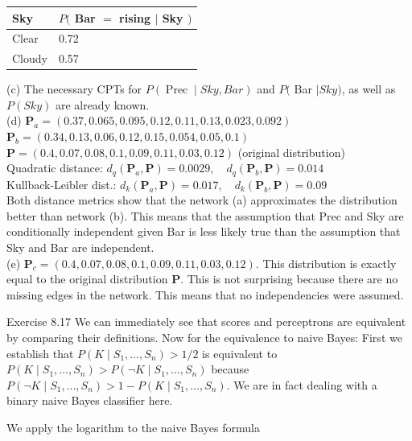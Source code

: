 \documentclass[10pt]{article}
\begin{document}
\begin{center}
\begin{tabular}{ll}
\hline
Sky & $P($ Bar $=$ rising $\mid$ Sky $)$ \\
\hline
Clear & 0.72 \\
\hline
Cloudy & 0.57 \\
\hline
\end{tabular}
\end{center}

(c) The necessary CPTs for $P(\operatorname{Prec} \mid S k y, B a r)$ and $P($ Bar $\mid S k y)$, as well as $P(S k y)$ are already known.\\
(d) $\boldsymbol{P}_{a}=(0.37,0.065,0.095,0.12,0.11,0.13,0.023,0.092)$\\
$\boldsymbol{P}_{b}=(0.34,0.13,0.06,0.12,0.15,0.054,0.05,0.1)$\\
$\boldsymbol{P}=(0.4,0.07,0.08,0.1,0.09,0.11,0.03,0.12)$ (original distribution)\\
Quadratic distance: $d_{q}\left(\boldsymbol{P}_{a}, \boldsymbol{P}\right)=0.0029, \quad d_{q}\left(\boldsymbol{P}_{b}, \boldsymbol{P}\right)=0.014$\\
Kullback-Leibler dist.: $d_{k}\left(\boldsymbol{P}_{a}, \boldsymbol{P}\right)=0.017, \quad d_{k}\left(\boldsymbol{P}_{b}, \boldsymbol{P}\right)=0.09$\\
Both distance metrics show that the network (a) approximates the distribution better than network (b). This means that the assumption that Prec and Sky are conditionally independent given Bar is less likely true than the assumption that Sky and Bar are independent.\\
(e) $\boldsymbol{P}_{c}=(0.4,0.07,0.08,0.1,0.09,0.11,0.03,0.12)$. This distribution is exactly equal to the original distribution $\boldsymbol{P}$. This is not surprising because there are no missing edges in the network. This means that no independencies were assumed.

Exercise 8.17 We can immediately see that scores and perceptrons are equivalent by comparing their definitions. Now for the equivalence to naive Bayes: First we establish that $P\left(K \mid S_{1}, \ldots, S_{n}\right)>1 / 2$ is equivalent to $P\left(K \mid S_{1}, \ldots, S_{n}\right)> P\left(\neg K \mid S_{1}, \ldots, S_{n}\right)$ because $P\left(\neg K \mid S_{1}, \ldots, S_{n}\right)>1-P\left(K \mid S_{1}, \ldots, S_{n}\right)$. We are in fact dealing with a binary naive Bayes classifier here.

We apply the logarithm to the naive Bayes formula
\end{document}

